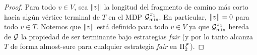 \begin{proof}

  
  Para todo $v\in V$, sea ${\lVert{v}\rVert}$ la longitud del fragmento de camino más corto hacia algún vértice terminal de $T$ en el MDP
  $\mathcal{G}^{\pi_{1}}_{\min}$.   En particular, ${\lVert{v}\rVert}=0$ para todo $v\in T$.  Notemos que ${\lVert{v}\rVert}$ está definido para todo
  $v\in V$ ya que $\mathcal{G}^{\pi_{1}}_{\min}$ hereda de $\mathcal{G}$ la
  propiedad de ser terminante bajo estrategias \emph{fair} (y por lo tanto alcanza
  $T$ de forma almost-sure para cualquier estrategia \emph{fair} en $\Pi^{\mathcal{F}}_{2}$).
  

\end{proof}
